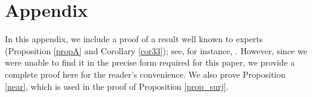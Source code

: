 \documentclass[12pt,leqno,twoside]{amsart}
\theoremstyle{plain}
\theoremstyle{definition}
\begin{document}
\appendix
\section*{Appendix} %


\setcounter{section}{1}
\renewcommand{\thesection}{A}

In this appendix, we include a proof of a result well known to experts (Proposition \ref{propA} and Corollary \ref{cor33}); see, for instance, \cite[Section 6.1]{Tib}. However, since we were unable to find it in the precise form required for this paper, we provide a complete proof here for the reader’s convenience. We also prove Proposition \ref{near}, which is used in the proof of Proposition \ref{prop_surj}.
\end{document}
